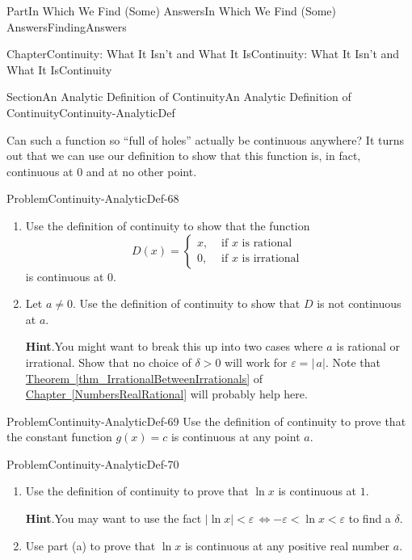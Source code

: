 \documentclass[oneside,10pt,]{book}
\newcommand{\blocktitlefont}{\relax}
\newcommand{\xreffont}{\relax}
\numberwithin{equation}{part}
\newcommand{\abs}[1]{\left|#1\right|}
\newcommand{\eps}{\varepsilon}
\newcommand{\lt}{<}
\newcommand{\amp}{&}
\begin{document}
\begin{partptx}{Part}{In Which We Find (Some) Answers}{}{In Which We Find (Some) Answers}{}{}{FindingAnswers}
\begin{chapterptx}{Chapter}{Continuity: What It Isn't and What It Is}{}{Continuity: What It Isn't and What It Is}{}{}{Continuity}
\begin{sectionptx}{Section}{An Analytic Definition of Continuity}{}{An Analytic Definition of Continuity}{}{}{Continuity-AnalyticDef}
\begin{image}{0.2}{0.6}{0.2}{}
\end{image}%
Can such a function so ``full of holes'' actually be continuous anywhere?  It turns out that we can use our definition to show that this function is, in fact, continuous at \(0\) and at no other point.%
\begin{problem}{Problem}{}{Continuity-AnalyticDef-68}%
\begin{enumerate}[font=\bfseries,label=(\alph*),ref=\alph*]%
\item{}Use the definition of continuity to show that the function%
\begin{equation*}
D(x)= \begin{cases}
x,\amp \text{ if } x\text{ is rational } \\
0,\amp \text{ if } x\text{ is irrational } \end{cases} 
\end{equation*}
is continuous at \(0\).%
\item{}Let \(a\neq 0\).  Use the definition of continuity to show that \(D\) is not continuous at \(a\).%
\par\smallskip%
\noindent\textbf{\blocktitlefont Hint}.\hypertarget{Continuity-AnalyticDef-68-3-2}{}\quad{}You might want to break this up into two cases where \(a\) is rational or irrational.  Show that no choice of \(\delta>0\) will work for \(\eps=|\,a|\).  Note that \hyperref[thm_IrrationalBetweenIrrationals]{Theorem~{\xreffont\ref{thm_IrrationalBetweenIrrationals}}} of \hyperref[NumbersRealRational]{Chapter~{\xreffont\ref{NumbersRealRational}}} will probably help here.%
\end{enumerate}%
\end{problem}
\begin{problem}{Problem}{}{Continuity-AnalyticDef-69}%
Use the definition of continuity to prove that the constant function \(g(x)=c\) is continuous at any point \(a\).%
\end{problem}
\begin{problem}{Problem}{}{Continuity-AnalyticDef-70}%
\begin{enumerate}[font=\bfseries,label=(\alph*),ref=\alph*]%
\item{}Use the definition of continuity to prove that \(\ln x\) is continuous at \(1\).%
\par\smallskip%
\noindent\textbf{\blocktitlefont Hint}.\hypertarget{Continuity-AnalyticDef-70-2-2}{}\quad{}You may want to use the fact \(\abs{\ln x}\lt
\eps\,\Leftrightarrow-\eps\lt \ln x\lt \eps\) to find a \(\delta\).%
\item{}Use part (a) to prove that \(\ln x\) is continuous at any positive real number \(a\).%

\end{enumerate}
\end{problem}
\end{sectionptx}
\end{chapterptx}
\end{partptx}
\end{document}
